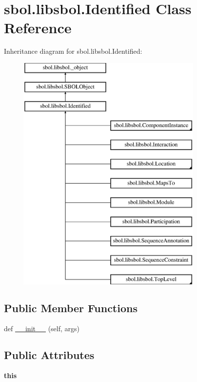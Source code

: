 \hypertarget{classsbol_1_1libsbol_1_1_identified}{}\section{sbol.\+libsbol.\+Identified Class Reference}
\label{classsbol_1_1libsbol_1_1_identified}
Inheritance diagram for sbol.\+libsbol.\+Identified\+:\begin{figure}[H]
\begin{center}
\leavevmode
\includegraphics[height=12.000000cm]{classsbol_1_1libsbol_1_1_identified}
\end{center}
\end{figure}
\subsection*{Public Member Functions}
\begin{DoxyCompactItemize}
\item 
def \hyperlink{classsbol_1_1libsbol_1_1_identified_aa88796896d61333684a0991aa1d8734f}{\+\_\+\+\_\+init\+\_\+\+\_\+} (self, args)
\end{DoxyCompactItemize}
\subsection*{Public Attributes}
\begin{DoxyCompactItemize}
\item 
{\bfseries this}\hypertarget{classsbol_1_1libsbol_1_1_identified_aeaddc88dd54cf84e94eb476e2ce1303e}{}\label{classsbol_1_1libsbol_1_1_identified_aeaddc88dd54cf84e94eb476e2ce1303e}

\end{DoxyCompactItemize}
